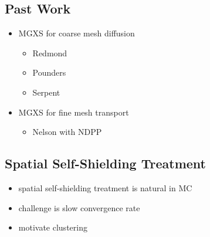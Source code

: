 \subsection{Past Work}
\label{subsec:chap2-past-work}

\begin{itemize}[noitemsep]
  \item \ac{MGXS} for coarse mesh diffusion
  \begin{itemize}[noitemsep]
    \item Redmond
    \item Pounders
    \item Serpent
  \end{itemize}
  \item \ac{MGXS} for fine mesh transport
  \begin{itemize}[noitemsep]
    \item Nelson with NDPP
  \end{itemize}
\end{itemize}

\subsection{Spatial Self-Shielding Treatment}
\label{subsec:chap2-spatial-shield}

\begin{itemize}[noitemsep]
  \item spatial self-shielding treatment is natural in \ac{MC}
  \item challenge is slow convergence rate
  \item motivate clustering
\end{itemize}
